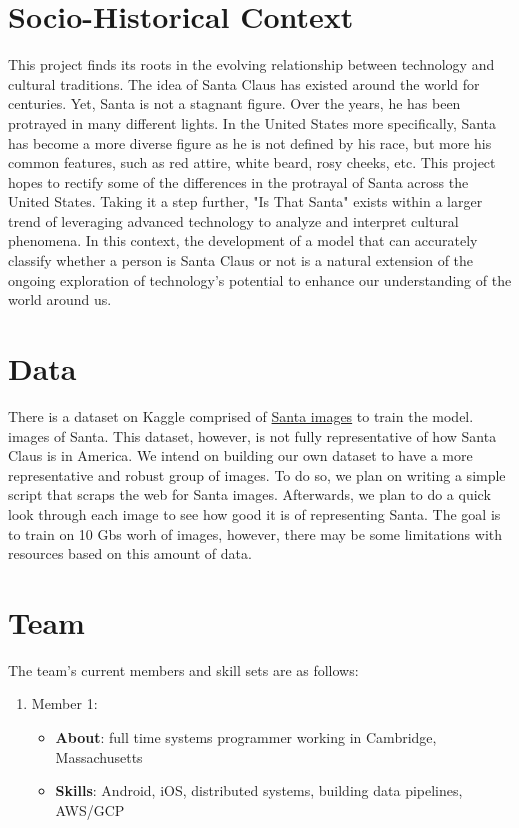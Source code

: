 \section*{Socio-Historical Context}
This project finds its roots in the evolving relationship between technology and cultural traditions. The idea of Santa Claus has 
existed around the world for centuries. Yet, Santa is not a stagnant figure. Over the years, he has been protrayed in many 
different lights. In the United States more specifically, Santa has become a more diverse figure as he is not defined by his 
race, but more his common features, such as red attire, white beard, rosy cheeks, etc. This project hopes to rectify some of the differences 
in the protrayal of Santa across the United States. Taking it a step further, "Is That Santa" exists within a larger trend of leveraging advanced 
technology to analyze and interpret cultural phenomena. In this context, the development of a model that 
can accurately classify whether a person is Santa Claus or not is a natural extension of the ongoing exploration of 
technology's potential to enhance our understanding of the world around us.

\section*{Data}
There is a dataset on Kaggle comprised of \href{https://www.kaggle.com/datasets/deepcontractor/is-that-santa-image-classification/code}{Santa images} to train the model.
{images of Santa}. This dataset, however, is not fully representative of how Santa Claus is in America. We intend on building our own dataset to have a more representative 
and robust group of images. To do so, we plan on writing a simple script that scraps the web for Santa images. Afterwards, we plan to do a quick look through each image to see 
how good it is of representing Santa. The goal is to train on 10 Gbs worh of images, however, there may be some limitations with resources based on this amount of data.


\section*{Team}
The team's current members and skill sets are as follows:
\begin{enumerate}
  \item Member 1:
  \begin{itemize} 
    \item \textbf{About}: full time 
    systems programmer working in Cambridge, Massachusetts
    \item \textbf{Skills}: Android, iOS, distributed systems, building data pipelines, AWS/GCP
  \end{itemize}
\end{enumerate}
